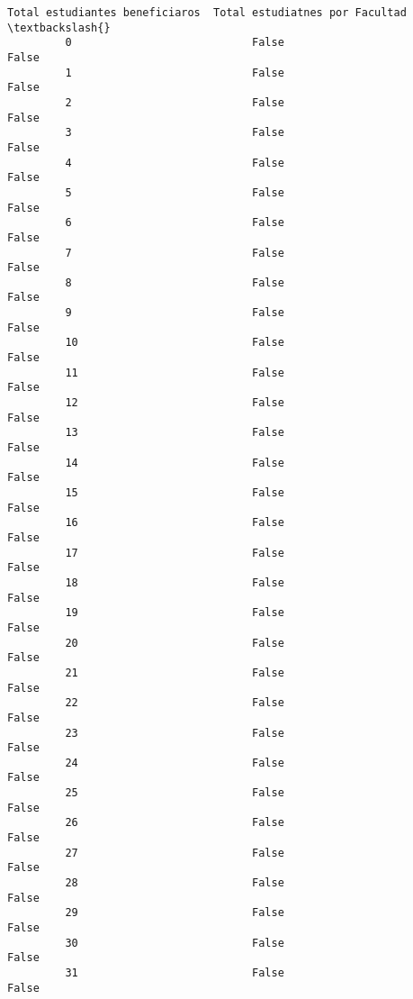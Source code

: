 \documentclass[11pt]{article}
\begin{document}
\begin{Verbatim}[commandchars=\\\{\}]
             Total estudiantes beneficiaros  Total estudiatnes por Facultad  \textbackslash{}
         0                            False                           False   
         1                            False                           False   
         2                            False                           False   
         3                            False                           False   
         4                            False                           False   
         5                            False                           False   
         6                            False                           False   
         7                            False                           False   
         8                            False                           False   
         9                            False                           False   
         10                           False                           False   
         11                           False                           False   
         12                           False                           False   
         13                           False                           False   
         14                           False                           False   
         15                           False                           False   
         16                           False                           False   
         17                           False                           False   
         18                           False                           False   
         19                           False                           False   
         20                           False                           False   
         21                           False                           False   
         22                           False                           False   
         23                           False                           False   
         24                           False                           False   
         25                           False                           False   
         26                           False                           False   
         27                           False                           False   
         28                           False                           False   
         29                           False                           False   
         30                           False                           False   
         31                           False                           False   

\end{Verbatim}
\end{document}
